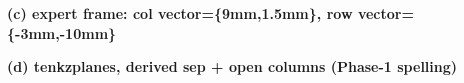 \documentclass[varwidth=20cm, border=6pt]{standalone}
\begin{document}
\medskip
\textbf{(c) expert frame: col vector=\{9mm,1.5mm\},
  row vector=\{-3mm,-10mm\}}\par\smallskip
\begin{tenkzlattice}[rows=3, cols=3, col vector={9mm,1.5mm},
                     row vector={-3mm,-10mm}, boundary legs]
\end{tenkzlattice}

\medskip
\textbf{(d) tenkzplanes, derived sep + open columns (Phase-1 spelling)}%
\par\smallskip
\begin{tenkzplanes}[rows=3, cols=3, sheets={ket, bra}]
\end{tenkzplanes}

\medskip
\begin{tenkzplanes}[rows=3, cols=3, open={(1,2),(3,3)}]
\end{tenkzplanes}
\end{document}
